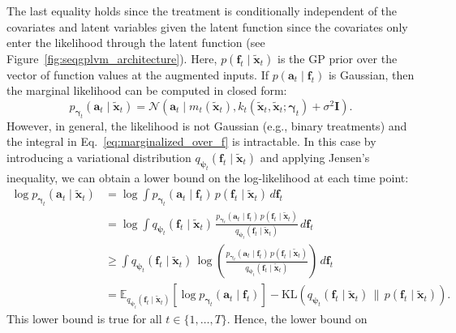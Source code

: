 The last equality holds since the treatment is 
conditionally independent of the covariates and latent variables
given the latent function since the covariates only enter the likelihood through 
the latent function (see Figure~\ref{fig:seqgplvm_architecture}). Here, 
\(p(\mathbf{f}_t\mid \widetilde{\mathbf{x}}_t)\) is the GP prior over 
the vector of function values at the 
augmented inputs. 
If $p(\mathbf{a}_t\mid \mathbf{f}_t)$ is Gaussian, then 
the marginal likelihood can be computed in closed form: 
\[
p_{\boldsymbol{\gamma}_t}(\mathbf{a}_t\mid \widetilde{\mathbf{x}}_{t}) 
=\mathcal{N}\!\left(\mathbf{a}_t \mid m_t(\widetilde{\mathbf{x}}_t), k_t(\widetilde{\mathbf{x}}_t, \widetilde{\mathbf{x}}_t; \boldsymbol{\gamma}_t) + \sigma^2 \mathbf{I}\right). 
\]
However, in general, the likelihood is not Gaussian (e.g., binary treatments) 
and the integral in Eq.~\eqref{eq:marginalized_over_f} is intractable. In this 
case by introducing a variational distribution 
\(q_{\boldsymbol{\psi}_t}(\mathbf{f}_t\mid \widetilde{\mathbf{x}}_{t})\) 
and applying Jensen's inequality, we can obtain a lower 
bound on the log-likelihood at each time point:
\begin{align*}
\log p_{\boldsymbol{\gamma}_t}(\mathbf{a}_t\mid \widetilde{\mathbf{x}}_{t})
&= \log \int p_{\boldsymbol{\gamma}_t}(\mathbf{a}_t\mid \mathbf{f}_t) \, p(\mathbf{f}_t\mid \widetilde{\mathbf{x}}_{t})\, d\mathbf{f}_t \nonumber\\
&= \log \int q_{\boldsymbol{\psi}_t}(\mathbf{f}_t\mid \widetilde{\mathbf{x}}_{t}) \,
\frac{p_{\boldsymbol{\gamma}_t}(\mathbf{a}_t\mid \mathbf{f}_t) \, p(\mathbf{f}_t\mid \widetilde{\mathbf{x}}_{t})}
{q_{\boldsymbol{\psi}_t}(\mathbf{f}_t\mid \widetilde{\mathbf{x}}_{t})}\, d\mathbf{f}_t \nonumber\\
&\ge \int q_{\boldsymbol{\psi}_t}(\mathbf{f}_t\mid \widetilde{\mathbf{x}}_{t}) \,
\log\!\left(
\frac{p_{\boldsymbol{\gamma}_t}(\mathbf{a}_t\mid \mathbf{f}_t) \, p(\mathbf{f}_t\mid \widetilde{\mathbf{x}}_{t})}
{q_{\boldsymbol{\psi}_t}(\mathbf{f}_t\mid \widetilde{\mathbf{x}}_{t})}
\right)\, d\mathbf{f}_t \\
&= \mathbb{E}_{q_{\boldsymbol{\psi}_t}(\mathbf{f}_t\mid \widetilde{\mathbf{x}}_{t})}
\!\left[\log p_{\boldsymbol{\gamma}_t}(\mathbf{a}_t\mid \mathbf{f}_t)\right]
- \mathrm{KL}\!\left(
q_{\boldsymbol{\psi}_t}(\mathbf{f}_t\mid \widetilde{\mathbf{x}}_{t})
\,\big\|\,
p(\mathbf{f}_t\mid \widetilde{\mathbf{x}}_{t})
\right).
\end{align*}
This lower bound is true for all $t \in \{1, \ldots, T\}$. Hence, the lower bound on 
